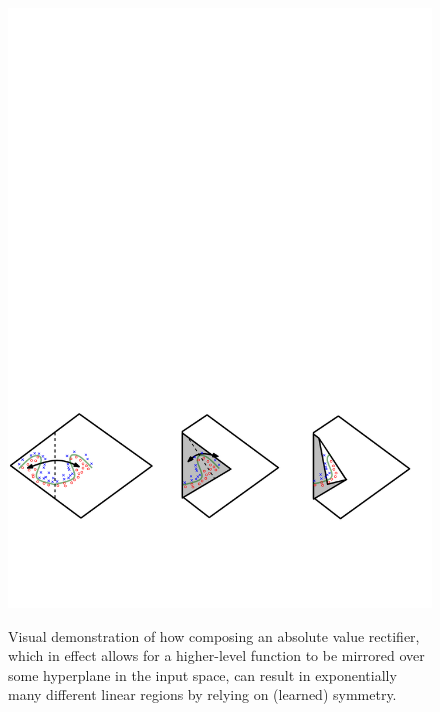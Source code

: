\documentclass{article}
\begin{document}
\begin{figure}[!h]
\centering
{\includegraphics[width=\textwidth]{montufar2014.pdf}}
  \caption{Visual demonstration of how composing an absolute value rectifier, which in effect allows for a higher-level function to be mirrored over some hyperplane in the input space, can result in exponentially many different linear regions by relying on (learned) symmetry.}
\label{fig:montufar}
\end{figure}
\end{document}
